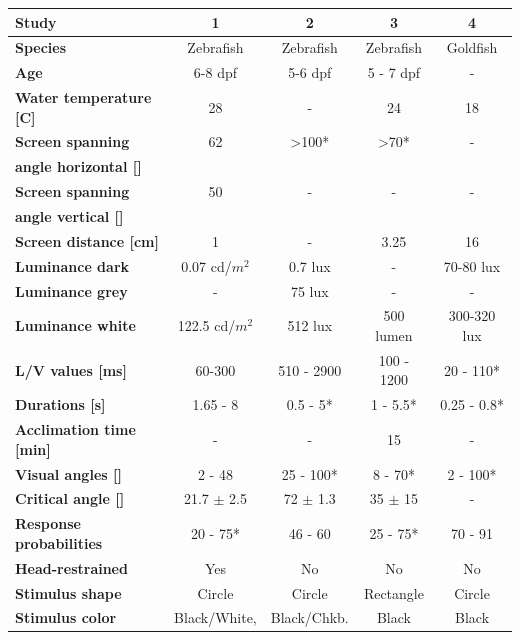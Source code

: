 \documentclass[a4paper,10pt,hidelinks]{scrreprt}
\begin{document}
	\begin{table} [!th]
		\begin{center}
			\begin{tabular}{l|c|c|c|c}
				\textbf{Study} & \textbf{1} & \textbf{2} & \textbf{3} & \textbf{4}\\
				\hline
				\textbf{Species} & Zebrafish & Zebrafish & Zebrafish & Goldfish\\
				\textbf{Age} & 6-8 dpf & 5-6 dpf & 5 - 7 dpf & -\\
				\textbf{Water temperature [\textdegree C]} & 28  & - & 24  & 18 \\
				\textbf{Screen spanning} & 62 & >100* & >70* & -\\
				\textbf{angle horizontal [\textdegree]} & & & & \\
				\textbf{Screen spanning} & 50 & - & - & -\\
				\textbf{angle vertical [\textdegree]} & & & & \\
				\textbf{Screen distance [cm]} & 1 & - & 3.25 & 16\\
				\textbf{Luminance dark} & 0.07 cd/$m^2$ & 0.7 lux & - & 70-80 lux\\
				\textbf{Luminance grey} & - & 75 lux & - & -\\
				\textbf{Luminance white} & 122.5 cd/$m^2$ & 512 lux & 500 lumen & 300-320 lux\\
				\textbf{L/V values [ms]} & 60-300 \dag & 510 - 2900 \dag & 100 - 
				1200 & 20 - 110*\\
				\textbf{Durations [s]} & 1.65 - 8 & 0.5 - 5* & 1 - 5.5* & 0.25 - 0.8*\\
				\textbf{Acclimation time [min]} & - & - & 15 & -\\
				\textbf{Visual angles [\textdegree]} & 2 - 48 & 25 - 100* & 8 - 70* & 2 - 100*\\
				\textbf{Critical angle [\textdegree]} & 21.7 $\pm$ 2.5 & 72 $\pm$ 1.3 & 35 $\pm$ 15 
				& -\\
				\textbf{Response probabilities} & 20 - 75* & 46 - 60 & 25 - 75* & 70 - 91\\
				\textbf{Head-restrained} & Yes & No & No & No\\
				\textbf{Stimulus shape} & Circle & Circle & Rectangle & Circle\\
				\textbf{Stimulus color} & Black/White, & Black/Chkb. & Black & Black\\

\end{tabular}
\end{center}
\end{table}
\end{document}

